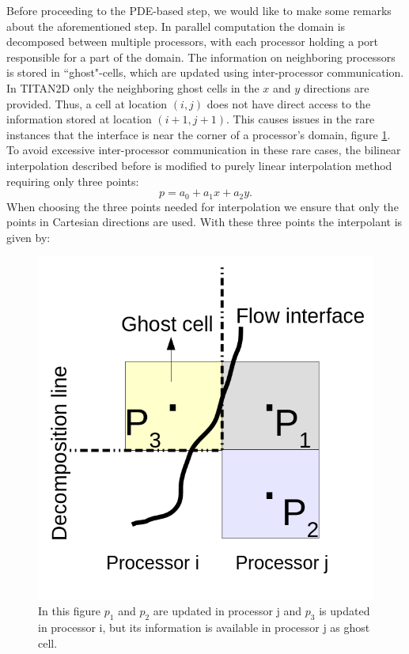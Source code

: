 \documentclass[review]{elsarticle}
\begin{document}
Before proceeding to the PDE-based step, we would like to make some remarks about the aforementioned step. 
In parallel computation the domain is decomposed between multiple processors, with each processor holding a port responsible for a part of the domain. 
The information on neighboring processors is stored in ``ghost"-cells, which are updated using inter-processor communication. In TITAN2D only the neighboring ghost
cells in the $x$ and $y$ directions are provided. Thus, a cell at location $(i,j)$ does not have direct access to the information stored at location $(i+1, j+1)$. 
This causes issues in the rare instances that the interface is near the corner of a processor's domain, figure \ref{fig:surf_interp}. To avoid 
excessive inter-processor communication in these rare cases, the bilinear interpolation described before is modified to purely linear interpolation method requiring 
only three points:
\begin{equation}
\label{Surface}
p=a_0+a_1 x+a_2 y.
\end{equation} 
When choosing the three points needed for interpolation we ensure that only the points in Cartesian directions are used.
With these three points the interpolant is given by:
\begin{figure}[ht]
\centering
\includegraphics[scale=.25]{IMAGES/surf_interp.png}
\caption{In this figure $p_1$ and $p_2$ are updated in processor j and $p_3$ is updated in processor i, but its information is available in processor j as ghost cell. }
                \label{fig:surf_interp}
\end{figure}
\end{document}
